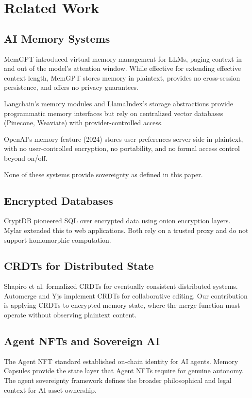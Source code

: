 \section{Related Work}

\label{sec:related}

\subsection{AI Memory Systems}

MemGPT \cite{packer2023memgpt} introduced virtual memory management for LLMs, paging context in and out of the model's attention window. While effective for extending effective context length, MemGPT stores memory in plaintext, provides no cross-session persistence, and offers no privacy guarantees.

Langchain's memory modules and LlamaIndex's storage abstractions provide programmatic memory interfaces but rely on centralized vector databases (Pinecone, Weaviate) with provider-controlled access.

OpenAI's memory feature (2024) stores user preferences server-side in plaintext, with no user-controlled encryption, no portability, and no formal access control beyond on/off.

None of these systems provide sovereignty as defined in this paper.

\subsection{Encrypted Databases}

CryptDB \cite{popa2011cryptdb} pioneered SQL over encrypted data using onion encryption layers. Mylar \cite{popa2014mylar} extended this to web applications. Both rely on a trusted proxy and do not support homomorphic computation.

\subsection{CRDTs for Distributed State}

Shapiro et al. \cite{shapiro2011crdt} formalized CRDTs for eventually consistent distributed systems. Automerge and Yjs implement CRDTs for collaborative editing. Our contribution is applying CRDTs to encrypted memory state, where the merge function must operate without observing plaintext content.

\subsection{Agent NFTs and Sovereign AI}

The Agent NFT standard \cite{zoo-agent-nft} established on-chain identity for AI agents. Memory Capsules provide the state layer that Agent NFTs require for genuine autonomy. The \Lux{} agent sovereignty framework \cite{lux-agent-sovereignty} defines the broader philosophical and legal context for AI asset ownership.


